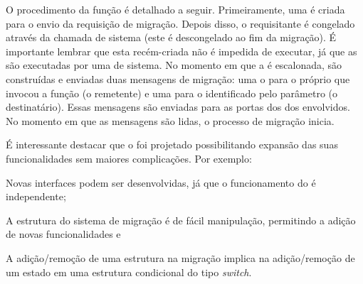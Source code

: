 O procedimento da função \kmigrateto é detalhado a seguir. Primeiramente, uma \task é criada para o envio da requisição de migração. Depois disso, o \cluster requisitante é congelado através da chamada de sistema \freeze (este \cluster é descongelado ao fim da migração). É importante lembrar que esta \task recém-criada não é impedida de executar, já que as \tasks são executadas por uma \thread de sistema. No momento em que a \task é escalonada, são construídas e enviadas duas mensagens de migração: uma o para o próprio \cluster que invocou a função \kmigrateto (o remetente) e uma para o \cluster identificado pelo parâmetro (o destinatário). Essas mensagens são enviadas para as portas \mailbox dos \daemons dos \clusters envolvidos. No momento em que as mensagens são lidas, o processo de migração inicia.

É interessante destacar que o \daemon foi projetado possibilitando expansão das suas funcionalidades sem maiores complicações. Por exemplo:
\begin{inlinelist}
    \item Novas interfaces podem ser desenvolvidas, já que o funcionamento do \daemon é independente;
    \item A estrutura do sistema de migração é de fácil manipulação, permitindo a adição de novas funcionalidades e
    \item A adição/remoção de uma estrutura na migração implica na adição/remoção de um estado em uma estrutura condicional do tipo \textit{switch}.
\end{inlinelist}

